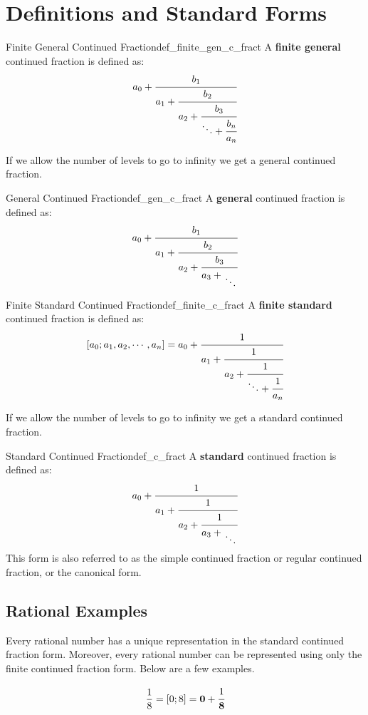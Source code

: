 \documentclass[a4paper]{article}
\begin{document}
\section{Definitions and Standard Forms}\label{cf:sec:definition}

\begin{mydefinition}{Finite General Continued Fraction}{def_finite_gen_c_fract}
A \textbf{finite general} continued fraction is defined as:
\[
  a_0 +
  \cfrac{b_1}{a_1+\cfrac{b_2}{a_2 +\cfrac{b_3}{\ddots + \cfrac{b_n}{a_n} }}}
\]
\end{mydefinition}

If we allow the number of levels to go to infinity we get a general continued fraction.

\begin{mydefinition}{General Continued Fraction}{def_gen_c_fract}
A \textbf{general} continued fraction is defined as:
\[
  a_0 +
  \cfrac{b_1}{a_1+\cfrac{b_2}{a_2 +\cfrac{b_3}{a_3 + \CFDots}}}
\]
\end{mydefinition}

\begin{mydefinition}{Finite Standard Continued Fraction}{def_finite_c_fract}
A \textbf{finite standard} continued fraction is defined as:
\[
  [a_0;a_1, a_2, \cdots, a_n] = a_0 +
  \cfrac{1}{a_1+\cfrac{1}{a_2 +\cfrac{1}{\ddots + \cfrac{1}{a_n}}}}
\]
\end{mydefinition}

If we allow the number of levels to go to infinity we get a standard continued fraction.

\begin{mydefinition}{Standard Continued Fraction}{def_c_fract}
A \textbf{standard} continued fraction is defined as:
\[
  a_0 +
  \cfrac{1}{a_1+\cfrac{1}{a_2 +\cfrac{1}{a_3 + \CFDots}}}
\]
This form is also referred to as the simple continued fraction or regular continued fraction, or the canonical form.
\end{mydefinition}

\subsection{Rational Examples}\label{cf:subsec:rational-examples}
Every rational number has a unique representation in the standard continued fraction form.
Moreover, every rational number can be represented using only the finite continued fraction form.
Below are a few examples.

\begin{equation*}
  \frac{1}{8} = [0;8] = \textbf{0} + \cfrac{1}{\textbf{8}}
\end{equation*}
\end{document}
